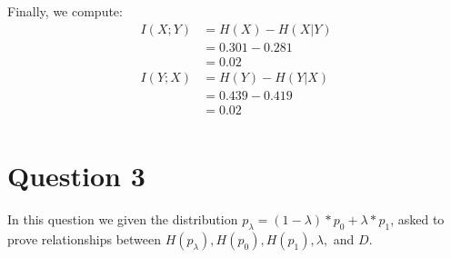 \documentclass{article}
\begin{document}
Finally, we compute:
\begin{align*}
I(X;Y) &= H(X) - H(X|Y)\\
&= 0.301 - 0.281\\
&= 0.02\\
I(Y;X) &= H(Y) - H(Y|X)\\
&= 0.439 - 0.419\\
&= 0.02\\
\end{align*}
\QED
\newpage

\section{Question 3}
In this question we given the distribution $p_{\lambda} = (1-\lambda)*p_0 + \lambda*p_1$, asked to prove relationships between $H(p_{\lambda}), H(p_0), H(p_1), \lambda,$ and $D$.
\end{document}
